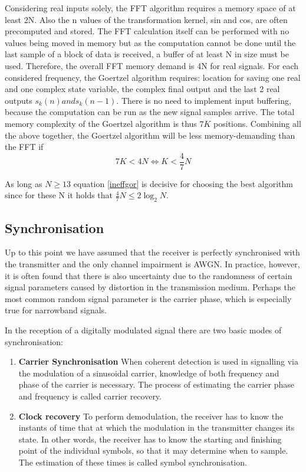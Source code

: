 \documentclass[12pt,a4paper,openright]{article}
\begin{document}
Considering real inputs solely, the FFT algorithm requires a memory space of at least 2N. Also the n values of the transformation kernel, sin and cos, are often precomputed and stored. The FFT calculation itself can be performed with no values being moved in memory but as the computation cannot be done until the last sample of a block of data is received, a buffer of at least N in size must be used. Therefore, the overall FFT memory demand is 4N for real signals.
For each considered frequency, the Goertzel algorithm requires: location for saving one real and one complex state variable, the complex final output and the last 2 real outputs $s_k(n) and s_k(n-1)$. There is no need to implement input buffering, because the computation can be run as the new signal samples arrive. The total memory complexity of the Goertzel algorithm is thus $7K$ positions. Combining all the above together, the Goertzel algorithm will be less memory-demanding than the FFT if
\[7K < 4N \Leftrightarrow K < \frac{4}{7}N\]

As long as $N\geq 13$ equation \ref{ineffgor} is decisive for choosing the best algorithm since for these N it holds that $\frac{4}{7} N \leq 2 \log_2 N$.

\subsection{Synchronisation}
\label{ts}
Up to this point we have assumed that the receiver is perfectly synchronised with the transmitter and the only channel impairment is AWGN. In practice, however, it is often found that there is also uncertainty due to the randomness of certain signal parameters caused by distortion in the transmission medium. Perhaps the most common random signal parameter is the carrier phase, which is especially true for narrowband signals. 

In the reception of a digitally modulated signal there are two basic modes of synchronisation:
\begin{enumerate}
\item \textbf{Carrier Synchronisation}  When coherent detection is used in signalling via the modulation of a sinusoidal carrier, knowledge of both frequency and phase of the carrier is necessary. The process of estimating the carrier phase and frequency is called carrier recovery. 

\item \textbf{Clock recovery} To perform demodulation, the receiver has to know the instants of time that at which the modulation in the transmitter changes its state. In other words, the receiver has to know the starting and finishing point of the individual symbols, so that it may determine when to sample. The estimation of these times is called symbol synchronisation.
\end{enumerate}
\end{document}
